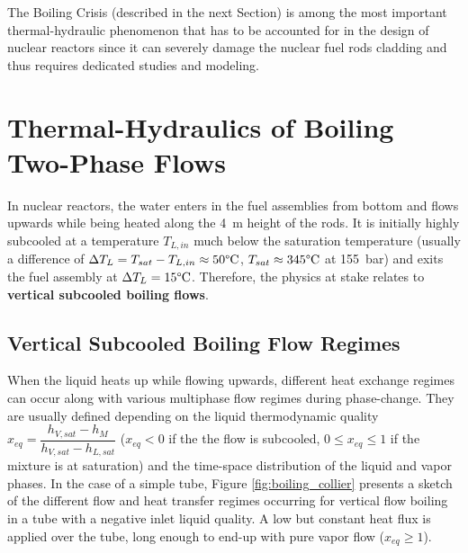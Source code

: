 \npar

The Boiling Crisis (described in the next Section) is among the most important thermal-hydraulic phenomenon that has to be accounted for in the design of nuclear reactors since it can severely damage the nuclear fuel rods cladding and thus requires dedicated studies and modeling. %


\section{Thermal-Hydraulics of Boiling Two-Phase Flows}

In nuclear reactors, the water enters in the fuel assemblies from bottom and flows upwards while being heated along the 4~m height of the rods. It is initially highly subcooled \ie at a temperature $T_{L,in}$ much below the saturation temperature (usually a difference of $\Delta T_{L} = T_{sat}-T_{L,in} \approx 50 \degree\mathrm{C}$, $T_{sat} \approx 345\degree\mathrm{C}$ at 155\ bar) and exits the fuel assembly at $\Delta T_{L} = 15\degree\mathrm{C}$. Therefore, the physics at stake relates to \textbf{vertical subcooled boiling flows}.


\subsection{Vertical Subcooled Boiling Flow Regimes}

When the liquid heats up while flowing upwards, different heat exchange regimes can occur along with various multiphase flow regimes during phase-change. They are usually defined depending on the liquid thermodynamic quality $x_{eq} = \dfrac{h_{V,sat}-h_{M}}{h_{V,sat}-h_{L,sat}}$ ($x_{eq}<0$ if the the flow is subcooled, $0 \leq x_{eq} \leq 1$ if the mixture is at saturation) and the time-space distribution of the liquid and vapor phases. In the case of a simple tube, Figure \ref{fig:boiling_collier} presents a sketch of the different flow and heat transfer regimes occurring for vertical flow boiling in a tube with a negative inlet liquid quality. A low but constant heat flux is applied over the tube, long enough to end-up with pure vapor flow ($x_{eq} \geq 1$).


